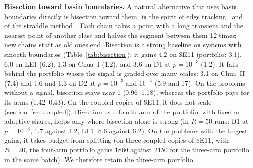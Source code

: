 

\textbf{Bisection toward basin boundaries.} A natural alternative that uses basin boundaries directly is bisection toward them, in the spirit of edge tracking~\cite{Skufca2006Edge,Schneider2007Edge} and of the straddle method~\cite{NusseYorke1989}. Each chain takes a point with a long transient and the nearest point of another class and halves the segment between them 12 times; new chains start as old ones end. Bisection is a strong baseline on systems with smooth boundaries (Table~\ref{tab:bisection}): it gains 4.2 on SE11 (portfolio: 3.1), 6.0 on LE1 (6.2), 1.3 on Chua~I (1.2), and 3.6 on D1 at $p=10^{-3}$ (1.2). It falls behind the portfolio where the signal is graded over many scales: 3.1 on Chua~II (7.4) and 1.6 and 1.3 on D2 at $p=10^{-3}$ and $10^{-4}$ (5.9 and 17). On the problems without a signal, bisection stays near 1 (0.96--1.18), whereas the portfolio pays for its arms (0.42--0.43). On the coupled copies of SE11, it does not scale (section~\ref{sec:coupled}). Bisection as a fourth arm of the portfolio, with fixed or adaptive shares, helps only where bisection alone is strong (in $R=50$ runs: D1 at $p=10^{-3}$, 1.7 against 1.2; LE1, 8.6 against 6.2). On the problems with the largest gains, it takes budget from splitting (on three coupled copies of SE11, with $R=20$, the four-arm portfolio gains 1860 against 2150 for the three-arm portfolio in the same batch). We therefore retain the three-arm portfolio.

